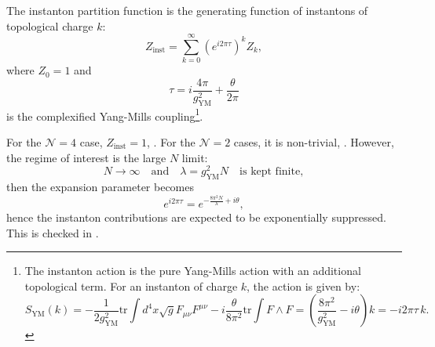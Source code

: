 The instanton partition function is the generating function of instantons of topological charge $k$:
\begin{equation}
 Z_\text{inst} = \sum_{k=0}^\infty (e^{i 2\pi\tau})^k Z_k,
\end{equation}
where $Z_0 = 1$ and 
\begin{equation}
\tau = i \frac{4\pi}{g_\text{YM}^2} + \frac{\theta}{2\pi} 
\end{equation}
is the complexified Yang-Mills coupling\footnote{
The instanton action is the pure Yang-Mills action with an additional topological term.
For an instanton of charge $k$, the action is given by:
\[
S_\text{YM} (k)=
    -\frac{1}{2 g_\text{YM}^2} \text{tr} \int d^4 x \sqrt{g} F_{\mu\nu} F^{\mu\nu}
    -i \frac{\theta}{8\pi^2} \text{tr} \int F \wedge F 
    = \left( \frac{8\pi^2}{g_\text{YM}^2} - i \theta \right) k
    = - i 2 \pi \tau \, k. 
\]
}.

For the $\mathcal{N}=4$ case, $Z_\text{inst} = 1$, \cite{Okuda:2010ke}.
For the $\mathcal{N}=2$ cases, it is non-trivial, \cite{Nekrasov:2002qd}.
However, the regime of interest is the large $N$ limit:
\begin{equation}\label{largeNlimit}
 N\rightarrow \infty \quad \text{and} \quad \lambda = g_\text{YM}^2 N \quad \text{is kept finite},
\end{equation}
then the expansion parameter becomes
$$e^{i 2\pi\tau}=e^{-\frac{8\pi^2 N}{\lambda} + i \theta},$$
hence the instanton contributions are expected to be exponentially suppressed. 
This is checked in \cite{Russo:2013kea}.


% 









